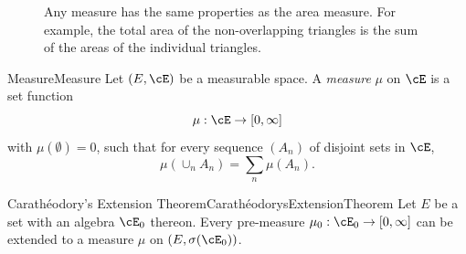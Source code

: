 \begin{figure}[H]
	\centering
	\caption{Any measure has the same properties as the area measure. For example, the total area of the non-overlapping triangles is the sum of the areas of the individual triangles.}
	\label{fig:MeasureProperties}
\end{figure}

\begin{defn}{Measure}{Measure}
	Let \((E, \cE)\) be a measurable space. A \textit{measure} \(\mu\) on \(\cE\) is a set function
	\begin{equation*}
		\mu : \cE \to [0, \infty]
	\end{equation*}
	with \(\mu(\emptyset) = 0\), such that for every sequence \((A_n)\) of disjoint sets in \(\cE\),
	\begin{equation}
		\mu(\cup_n A_n) = \sum_n \mu(A_n).
		\label{eq:SigmaAdditivity}
	\end{equation}
\end{defn}


\begin{thm}{Carathéodory's Extension Theorem}{CarathéodorysExtensionTheorem}
	Let \(E\) be a set with an algebra \(\cE_0\) thereon. Every pre-measure \(\mu_0 : \cE_0 \to [0, \infty]\) can be extended to a measure \(\mu\) on \((E, \sigma(\cE_0))\).
\end{thm}

